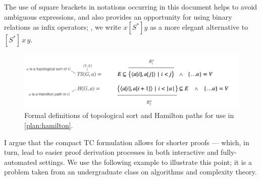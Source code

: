 The use of square brackets in notations occurring in this document helps to avoid ambiguous expressions, and also provides an opportunity for using binary relations as infix operators;
\eg, we write $x[S^*]y$ as a more elegant alternative to $[S^*]\,x\,y$.

\begin{figure}
\centering
\includegraphics[width=.8\textwidth]{img/topological-and-hamilton.png}
\caption{Formal definitions of topological sort and Hamilton paths
  for use in \autoref{plan:hamilton}.}
\label{plan:hamilton-defs}
\end{figure}

I argue that the compact TC formulation allows for shorter proofs --- which, in turn, lead to easier proof derivation processes in both interactive and fully-automated settings.
We use the following example to illustrate this point; it is a problem taken from an undergraduate class on algorithms and complexity theory.

